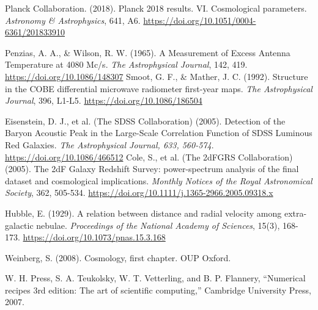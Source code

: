 
\begin{thebibliography}{999}
	 Planck Collaboration. (2018). Planck 2018 results. VI\@. Cosmological parameters. \textit{Astronomy \& Astrophysics}, 641, A6. \url{https://doi.org/10.1051/0004-6361/201833910}

	 Penzias, A. A., \& Wilson, R. W. (1965). A Measurement of Excess Antenna Temperature at 4080 Mc/s. \textit{The Astrophysical Journal}, 142, 419. \url{https://doi.org/10.1086/148307}
 Smoot, G. F., \& Mather, J. C. (1992). Structure in the COBE differential microwave radiometer first-year maps. \textit{The Astrophysical Journal}, 396, L1-L5. \url{https://doi.org/10.1086/186504}

	 Eisenstein, D. J., et al. (The SDSS Collaboration) (2005). Detection of the Baryon Acoustic Peak in the Large-Scale Correlation Function of SDSS Luminous Red Galaxies. \textit{The Astrophysical Journal, 633, 560-574}. \url{https://doi.org/10.1086/466512}
	 Cole, S., et al. (The 2dFGRS Collaboration) (2005). The 2dF Galaxy Redshift Survey: power-spectrum analysis of the final dataset and cosmological implications. \textit{Monthly Notices of the Royal Astronomical Society}, 362, 505-534. \url{https://doi.org/10.1111/j.1365-2966.2005.09318.x}



 Hubble, E. (1929). A relation between distance and radial velocity among extra-galactic nebulae. \textit{Proceedings of the National Academy of Sciences}, 15(3), 168-173. \url{https://doi.org/10.1073/pnas.15.3.168}

 Weinberg, S. (2008). Cosmology, first chapter. OUP Oxford. 

W. H. Press, S. A. Teukolsky, W. T. Vetterling, and B. P. Flannery, ``Numerical recipes 3rd edition: The art of scientific computing,'' Cambridge University Press, 2007.



\end{thebibliography}
